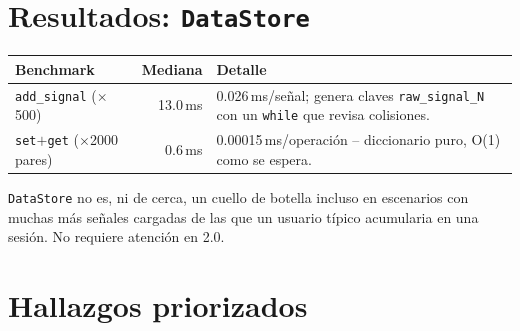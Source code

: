 \documentclass[11pt,a4paper]{article}
\begin{document}
\section{Resultados: \texttt{DataStore}}

\begin{center}
\begin{tabular}{lrl}
\toprule
\textbf{Benchmark} & \textbf{Mediana} & \textbf{Detalle} \\
\midrule
\texttt{add\_\allowbreak signal} ($\times$500) & 13.0\,ms & 0.026\,ms/señal; genera claves \texttt{raw\_\allowbreak signal\_\allowbreak N} con un \texttt{while} que revisa colisiones. \\
\texttt{set}$+$\texttt{get} ($\times$2000 pares) & 0.6\,ms & 0.00015\,ms/operación -- diccionario puro, O(1) como se espera. \\
\bottomrule
\end{tabular}
\end{center}

\texttt{DataStore} no es, ni de cerca, un cuello de botella incluso en escenarios con muchas más señales
cargadas de las que un usuario típico acumularia en una sesión. No requiere atención en 2.0.

\newpage
\section{Hallazgos priorizados}
\end{document}
